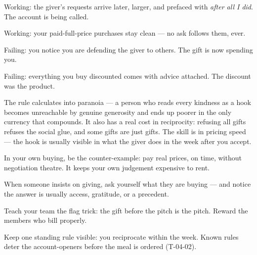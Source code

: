 \begin{feedback}
  \item Working: the giver's requests arrive later, larger, and prefaced with \emph{after all I did}. The account is being called.
  \item Working: your paid-full-price purchases stay clean --- no ask follows them, ever.
  \item Failing: you notice you are defending the giver to others. The gift is now spending you.
  \item Failing: everything you buy discounted comes with advice attached. The discount was the product.
\end{feedback}
\begin{failure}
The rule calculates into paranoia --- a person who reads every kindness as a hook becomes unreachable by genuine generosity and ends up poorer in the only currency that compounds. It also has a real cost in reciprocity: refusing all gifts refuses the social glue, and some gifts are just gifts. The skill is in pricing speed --- the hook is usually visible in what the giver does in the week after you accept.
\end{failure}
\begin{countermeasures}
  \item In your own buying, be the counter-example: pay real prices, on time, without negotiation theatre. It keeps your own judgement expensive to rent.
  \item When someone insists on giving, ask yourself what they are buying --- and notice the answer is usually access, gratitude, or a precedent.
  \item Teach your team the flag trick: the gift before the pitch is the pitch. Reward the members who bill properly.
  \item Keep one standing rule visible: you reciprocate within the week. Known rules deter the account-openers before the meal is ordered (T-04-02).
\end{countermeasures}

\seesources
{}
